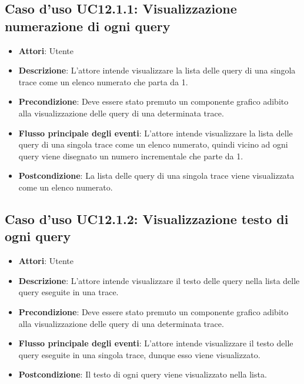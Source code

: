 \subsection{Caso d'uso UC12.1.1: Visualizzazione numerazione di ogni query}
\begin{itemize}
	\item \textbf{Attori}: Utente
	\item \textbf{Descrizione}: L'attore intende visualizzare la lista delle query di una singola trace come un elenco numerato che parta da 1.
	\item \textbf{Precondizione}: Deve essere stato premuto un componente grafico adibito alla visualizzazione delle query di una determinata trace.
	\item \textbf{Flusso principale degli eventi}: L'attore intende visualizzare la lista delle query di una singola trace come un elenco numerato, quindi vicino ad ogni query viene disegnato un numero incrementale che parte da 1.
	\item \textbf{Postcondizione}: La lista delle query di una singola trace viene visualizzata come un elenco numerato.
\end{itemize}
\subsection{Caso d'uso UC12.1.2: Visualizzazione testo di ogni query}
\begin{itemize}
	\item \textbf{Attori}: Utente
	\item \textbf{Descrizione}: L'attore intende visualizzare il testo delle query nella lista delle query eseguite in una trace.
	\item \textbf{Precondizione}: Deve essere stato premuto un componente grafico adibito alla visualizzazione delle query di una determinata trace.
	\item \textbf{Flusso principale degli eventi}: L'attore intende visualizzare il testo delle query eseguite in una singola trace, dunque esso viene visualizzato.
	\item \textbf{Postcondizione}: Il testo di ogni query viene visualizzato nella lista.
\end{itemize}

